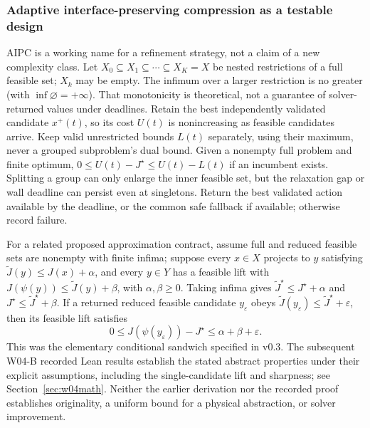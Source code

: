 \documentclass[11pt,letterpaper]{article}
\begin{document}
\subsubsection{Adaptive interface-preserving compression as a testable design}
AIPC is a working name for a refinement strategy, not a claim of a new complexity class. Let $X_0\subseteq X_1\subseteq\cdots\subseteq X_K=X$ be nested restrictions of a full feasible set; $X_k$ may be empty. The infimum over a larger restriction is no greater (with $\inf\varnothing=+\infty$). That monotonicity is theoretical, not a guarantee of solver-returned values under deadlines. Retain the best independently validated candidate $x^+(t)$, so its cost $U(t)$ is nonincreasing as feasible candidates arrive. Keep valid unrestricted bounds $L(t)$ separately, using their maximum, never a grouped subproblem's dual bound. Given a nonempty full problem and finite optimum, $0\le U(t)-J^\star\le U(t)-L(t)$ if an incumbent exists. Splitting a group can only enlarge the inner feasible set, but the relaxation gap or wall deadline can persist even at singletons. Return the best validated action available by the deadline, or the common safe fallback if available; otherwise record failure.

For a related proposed approximation contract, assume full and reduced feasible sets are nonempty with finite infima; suppose every $x\in X$ projects to $y$ satisfying $\widetilde J(y)\le J(x)+\alpha$, and every $y\in Y$ has a feasible lift with $J(\psi(y))\le\widetilde J(y)+\beta$, with $\alpha,\beta\ge0$. Taking infima gives $\widetilde J^\star\le J^\star+\alpha$ and $J^\star\le\widetilde J^\star+\beta$. If a returned reduced feasible candidate $y_\varepsilon$ obeys $\widetilde J(y_\varepsilon)\le\widetilde J^\star+\varepsilon$, then its feasible lift satisfies
\[
 0\le J(\psi(y_\varepsilon))-J^\star\le\alpha+\beta+\varepsilon.
\]
This was the elementary conditional sandwich specified in v0.3. The subsequent W04-B recorded Lean results establish the stated abstract properties under their explicit assumptions, including the single-candidate lift and sharpness; see Section~\ref{sec:w04math}. Neither the earlier derivation nor the recorded proof establishes originality, a uniform bound for a physical abstraction, or solver improvement.
\end{document}
